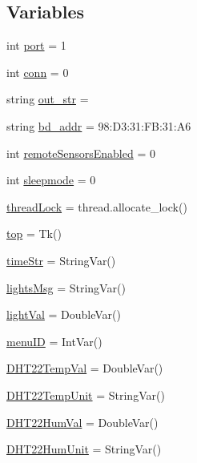 \subsection*{Variables}
\begin{DoxyCompactItemize}
\item 
int \hyperlink{namespaceSensorNode_ac561cd22e18ebc8f28a3de0fd790f84d}{port} = 1
\item 
int \hyperlink{namespaceSensorNode_ada87615462c1a9ae3b690316d00d0540}{conn} = 0
\item 
string \hyperlink{namespaceSensorNode_a653544a15782661968c67ccb4f6fbdbf}{out\+\_\+str} = \textquotesingle{}\textquotesingle{}
\item 
string \hyperlink{namespaceSensorNode_a37cb27925dc2a29cf8e92032d08246d7}{bd\+\_\+addr} = \textquotesingle{}98\+:D3\+:31\+:\+F\+B\+:31\+:\+A6\textquotesingle{}
\item 
int \hyperlink{namespaceSensorNode_a7150a62e1c3e9852c65457bbc8d81d70}{remote\+Sensors\+Enabled} = 0
\item 
int \hyperlink{namespaceSensorNode_ae86281b81a8af8bc3b9f4bfe75af4748}{sleepmode} = 0
\item 
\hyperlink{namespaceSensorNode_af39573d5009a8cac514cfb9a933ca24a}{thread\+Lock} = thread.\+allocate\+\_\+lock()
\item 
\hyperlink{namespaceSensorNode_ae263ac2260a4d567ff23b89689d63d15}{top} = Tk()
\item 
\hyperlink{namespaceSensorNode_a90f55cfa93e86a677d8c8fa8f50e325f}{time\+Str} = String\+Var()
\item 
\hyperlink{namespaceSensorNode_aa021e9235803e1ebb079307ed9df017a}{lights\+Msg} = String\+Var()
\item 
\hyperlink{namespaceSensorNode_abd196ae1282e31f9a34e8d10b5804fe9}{light\+Val} = Double\+Var()
\item 
\hyperlink{namespaceSensorNode_a731bf9524da43678f890375a99b0ead7}{menu\+ID} = Int\+Var()
\item 
\hyperlink{namespaceSensorNode_aaf69467b0a3b19ad4135c0328352f5af}{D\+H\+T22\+Temp\+Val} = Double\+Var()
\item 
\hyperlink{namespaceSensorNode_a9d59de8167347540e9e21562b6239a5b}{D\+H\+T22\+Temp\+Unit} = String\+Var()
\item 
\hyperlink{namespaceSensorNode_ab98e78199a57c6784976eb167af06203}{D\+H\+T22\+Hum\+Val} = Double\+Var()
\item 
\hyperlink{namespaceSensorNode_ac12964b10f125bd3256f2b57afb1eaff}{D\+H\+T22\+Hum\+Unit} = String\+Var()

\end{DoxyCompactItemize}
